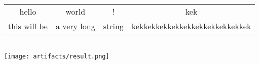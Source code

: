 \documentclass[a4paper, 12pt]{article}
\begin{document}
\begin{tabular}{cccc}
hello&world&!&kek\\this will be&a very long&string&kekkekkekkekkekkekkekkekkekkek
\end{tabular}\\
\texttt{[image: artifacts/result.png]}
\end{document}
